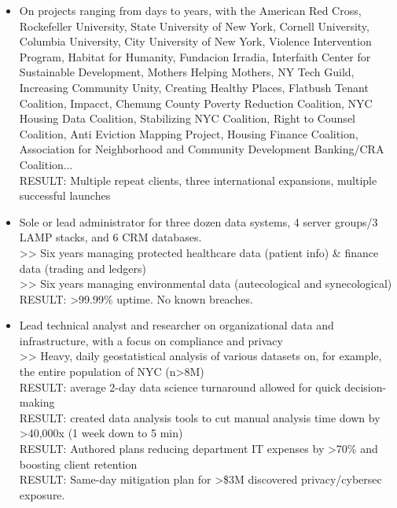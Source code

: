 \documentclass[]{deedy-resume-openfont}
\begin{document}
    \begin{itemize}
        \item On projects ranging from days to years, with the American Red Cross, Rockefeller University, State University of New York, Cornell University, Columbia University, City University of New York, Violence Intervention Program, Habitat for Humanity, Fundacion Irradia, Interfaith Center for Sustainable Development, Mothers Helping Mothers, NY Tech Guild, Increasing Community Unity, Creating Healthy Places, Flatbush Tenant Coalition, Impacct, Chemung County Poverty Reduction Coalition, NYC Housing Data Coalition, Stabilizing NYC Coalition, Right to Counsel Coalition, Anti Eviction Mapping Project, Housing Finance Coalition, Association for Neighborhood and Community Development Banking/CRA Coalition...
        \\RESULT: Multiple repeat clients, three international expansions, multiple successful launches
        \item Sole or lead administrator for three dozen data systems, 4 server groups/3 LAMP stacks, and 6 CRM databases.
        \\>> Six years managing protected healthcare data (patient info) \& finance data (trading and ledgers)
        \\>> Six years managing environmental data (autecological and synecological) 
        \\ RESULT: >99.99\% uptime. No known breaches.
        \item Lead technical analyst and researcher on organizational data and infrastructure, with a focus on compliance and privacy
        \\ >> Heavy, daily geostatistical analysis of various datasets on, for example, the entire population of NYC (n>8M)
        \\ RESULT: average 2-day data science turnaround allowed for quick decision-making
        \\ RESULT: created data analysis tools to cut manual analysis time down by >40,000x (1 week down to 5 min)
        \\ RESULT: Authored plans reducing department IT expenses by >70\% and boosting client retention
        \\ RESULT: Same-day mitigation plan for >\$3M discovered privacy/cybersec exposure.

\end{itemize}
\end{document}
